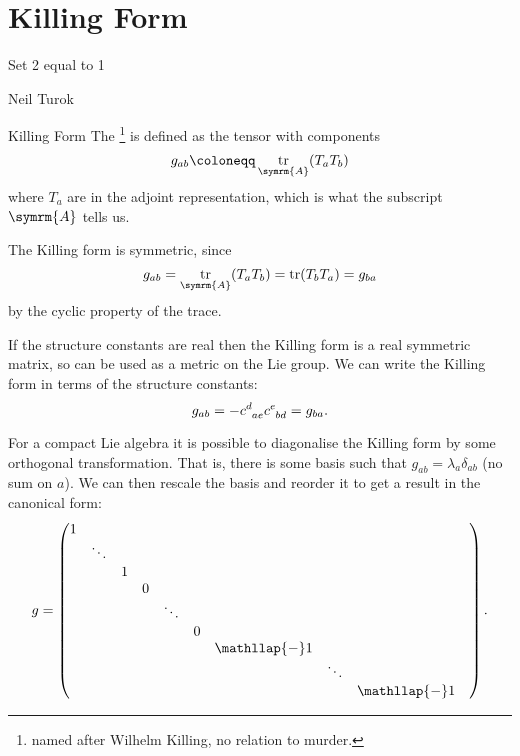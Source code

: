 \documentclass[fleqn]{NotesClass}
\DeclareMathOperator{\tr}{tr}
\begin{document}
    \section{Killing Form}
    \epigraph{Set 2 equal to 1}{Neil Turok}
    \begin{dfn}{Killing Form}{}
        The \footnote{named after Wilhelm Killing, no relation to murder.} is defined as the tensor with components
        \begin{equation}
            g_{ab} \coloneqq \tr_{\symrm{A}}(T_aT_b)
        \end{equation}
        where \(T_a\) are in the adjoint representation, which is what the subscript \(\symrm{A}\) tells us.
    \end{dfn}
    
    The Killing form is symmetric, since
    \begin{equation}
        g_{ab} = \tr_{\symrm{A}}(T_aT_b) = \tr(T_bT_a) = g_{ba}
    \end{equation}
    by the cyclic property of the trace.
    
    If the structure constants are real then the Killing form is a real symmetric matrix, so can be used as a metric on the Lie group.
    We can write the Killing form in terms of the structure constants:
    \begin{equation}
        g_{ab} = -\tensor{c}{^d_{ae}} \tensor{c}{^e_{bd}} = g_{ba}.
    \end{equation}

    For a compact Lie algebra it is possible to diagonalise the Killing form by some orthogonal transformation.
    That is, there is some basis such that \(g_{ab} = \lambda_a\delta_{ab}\) (no sum on \(a\)).
    We can then rescale the basis and reorder it to get a result in the canonical form:
    \begin{equation}
        g = 
        \begin{pmatrix}
            1 & & & & & & & & &\\
            & \ddots & & & & & & &\\
            & & 1 & & & & & &\\
            & & & 0 & & & & & \\
            & & & & \ddots & & & & \\
            & & & & & 0 & & & & \\
            & & & & & & \mathllap{-}1 & & \\
            & & & & & & & \ddots & \\
            & & & & & & & & \mathllap{-}1
        \end{pmatrix}
        .
    \end{equation}
\end{document}
